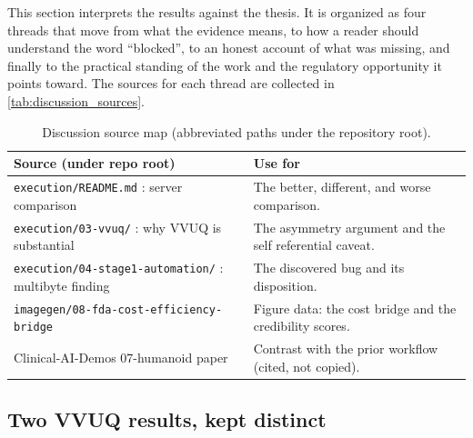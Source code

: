 
This section interprets the results against the thesis. It is organized as four
threads that move from what the evidence means, to how a reader should
understand the word ``blocked'', to an honest account of what was missing, and
finally to the practical standing of the work and the regulatory opportunity it
points toward. The sources for each thread are collected in
\autoref{tab:discussion_sources}.

\begin{table}[H]
\caption{Discussion source map (abbreviated paths under the repository root).}
\label{tab:discussion_sources}
\centering
\begin{tabularx}{\textwidth}{L{4.8cm} >{\raggedright\arraybackslash}X}
\toprule
\textbf{Source (under repo root)} & \textbf{Use for} \\
\midrule
  \texttt{execution/README.md} : server comparison & The better, different, and worse comparison. \\
  \texttt{execution/03-vvuq/} : why VVUQ is substantial & The asymmetry argument and the self referential caveat. \\
  \texttt{execution/04-stage1-automation/} : multibyte finding & The discovered bug and its disposition. \\
  \texttt{imagegen/08-fda-cost-efficiency-bridge} & Figure data: the cost bridge and the credibility scores. \\
  Clinical-AI-Demos 07-humanoid paper & Contrast with the prior workflow (cited, not copied). \\
\bottomrule
\end{tabularx}
\end{table}

\subsection{Two VVUQ results, kept distinct}

